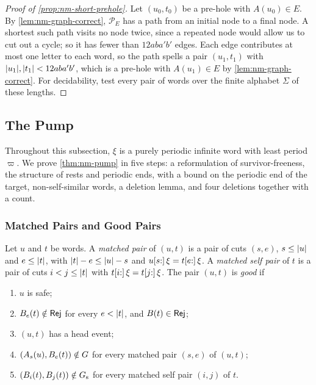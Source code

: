 \begin{proof}[Proof of \cref{prop:nm-short-prehole}]
Let $(u_0,t_0)$ be a pre-hole with $A(u_0)\in E$. By
\cref{lem:nm-graph-correct}, $\mathcal P_E$ has a path from an initial node to
a final node. A shortest such path visits no node twice, since a repeated node
would allow us to cut out a cycle; so it has fewer than $12aba'b'$ edges. Each
edge contributes at most one letter to each word, so the path spells a pair
$(u_1,t_1)$ with $\lvert u_1\rvert,\lvert t_1\rvert<12aba'b'$, which is a pre-hole with
$A(u_1)\in E$ by \cref{lem:nm-graph-correct}. For decidability, test every pair
of words over the finite alphabet $\Sigma$ of these lengths.
\end{proof}

\subsection{The Pump}\label{app:nm-pump}

Throughout this subsection, $\xi$ is a purely periodic infinite word with
least period $\varpi$. We prove \cref{thm:nm-pump} in five steps: a reformulation
of survivor-freeness, the structure of rests and periodic ends, with a bound
on the periodic end of the target, non-self-similar words, a deletion lemma,
and four deletions together with a count.

\subsubsection{Matched Pairs and Good Pairs}

\begin{definition}\label{def:nm-good}
Let $u$ and $t$ be words. A \emph{matched pair} of $(u,t)$ is a pair of cuts
$(s,e)$, $s\le\lvert u\rvert$ and $e\le\lvert t\rvert$, with $\lvert t\rvert-e\le\lvert u\rvert-s$ and
$u[s{:}]\,\xi=t[e{:}]\,\xi$. A \emph{matched self pair} of $t$ is a pair of
cuts $i<j\le\lvert t\rvert$ with $t[i{:}]\,\xi=t[j{:}]\,\xi$. The pair $(u,t)$ is
\emph{good} if
\begin{enumerate}[label=(G\arabic*)]
\item $u$ is safe;
\item $B_e(t)\notin\mathsf{Rej}$ for every $e<\lvert t\rvert$, and $B(t)\in\mathsf{Rej}$;
\item $(u,t)$ has a head event;
\item $(A_s(u),B_e(t))\notin G$ for every matched pair $(s,e)$ of $(u,t)$;
\item $(B_i(t),B_j(t))\notin G_{\mathrm{s}}$ for every matched self pair $(i,j)$ of
$t$.
\end{enumerate}
\end{definition}

